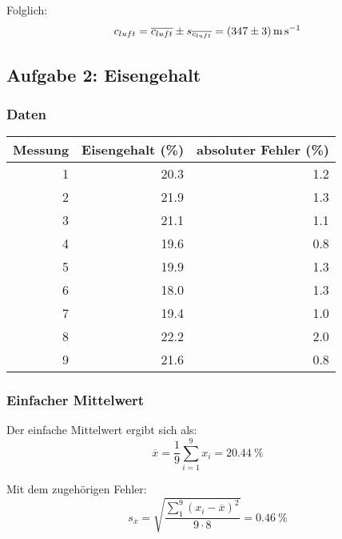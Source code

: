 Folglich:
\begin{equation}
    c_{luft} = \overline{c_{luft}} \pm s_{\overline{c_{luft}}} = \SI[separate-uncertainty = true]{347 \pm 3}{\meter\per\second}
\end{equation}

\clearpage
\subsection{Aufgabe 2: Eisengehalt}

\subsubsection{Daten}
\begin{center}
\begin{tabular}{rrr}
    \toprule
    Messung & Eisengehalt (\%) & absoluter Fehler (\%) \\
    \midrule
    1 & 20.3 & 1.2 \\
    2 & 21.9 & 1.3 \\
    3 & 21.1 & 1.1 \\
    4 & 19.6 & 0.8 \\
    5 & 19.9 & 1.3 \\
    6 & 18.0 & 1.3 \\
    7 & 19.4 & 1.0 \\
    8 & 22.2 & 2.0 \\
    9 & 21.6 & 0.8 \\
    \bottomrule
\end{tabular}
\end{center}

\subsubsection{Einfacher Mittelwert}

Der einfache Mittelwert ergibt sich als:
\begin{equation}
    \overline{x} = \frac{1}{9}\sum_{i=1}^9 x_i = \SI{20.44}{\percent}
\end{equation}

Mit dem zugeh\"origen Fehler:
\begin{equation}
    s_{\overline{x}} = \sqrt{\frac{\sum_1^9(x_i-\overline{x})^2}{9 \cdot 8}} = \SI{0.46}{\percent}
\end{equation}


